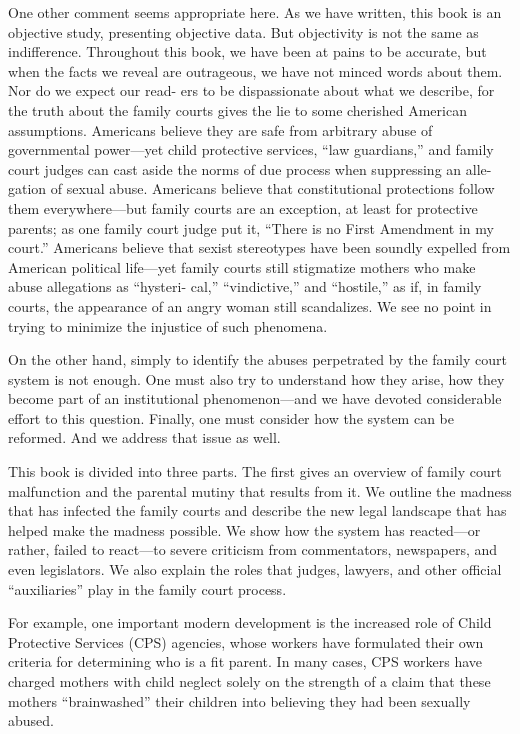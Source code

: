 One other comment seems appropriate here. As we have written, this
book is an objective study, presenting objective data. But objectivity
is not the same as indifference. Throughout this book, we have been
at pains to be accurate, but when the facts we reveal are outrageous,
we have not minced words about them. Nor do we expect our read-
ers to be dispassionate about what we describe, for the truth about the
family courts gives the lie to some cherished American assumptions.
Americans believe they are safe from arbitrary abuse of governmental
power—yet child protective services, “law guardians,” and family court
judges can cast aside the norms of due process when suppressing an alle-
gation of sexual abuse. Americans believe that constitutional protections
follow them everywhere—but family courts are an exception, at least for
protective parents; as one family court judge put it, “There is no First
Amendment in my court.” Americans believe that sexist stereotypes
have been soundly expelled from American political life—yet family
courts still stigmatize mothers who make abuse allegations as “hysteri-
cal,” “vindictive,” and “hostile,” as if, in family courts, the appearance of
an angry woman still scandalizes. We see no point in trying to minimize
the injustice of such phenomena. \pfl{}


On the other hand, simply to identify the abuses perpetrated by the
family court system is not enough. One must also try to understand how
they arise, how they become part of an institutional phenomenon—and
we have devoted considerable effort to this question. Finally, one must
consider how the system can be reformed. And we address that issue as
well. \pfl{}


This book is divided into three parts. The first gives an overview of
family court malfunction and the parental mutiny that results from it.
We outline the madness that has infected the family courts and describe
the new legal landscape that has helped make the madness possible. We
show how the system has reacted—or rather, failed to react—to severe
criticism from commentators, newspapers, and even legislators. We also
explain the roles that judges, lawyers, and other official “auxiliaries” play
in the family court process. \pfl{}


For example, one important modern development is the increased
role of Child Protective Services (CPS) agencies, whose workers have
formulated their own criteria for determining who is a fit parent. In
many cases, CPS workers have charged mothers with child neglect
solely on the strength of a claim that these mothers “brainwashed” their
children into believing they had been sexually abused. \pfl{}


